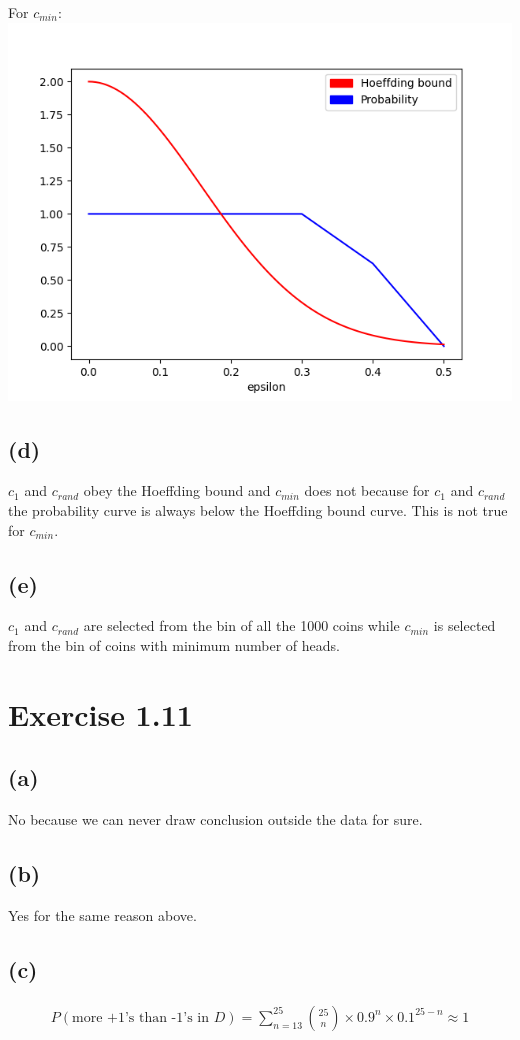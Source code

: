 \documentclass{article}
\begin{document}
		For $c_{min}$:\\
		\includegraphics[scale=0.8]{epsilon_min.png}
	\subsection*{(d)}
		$c_1$ and $c_{rand}$ obey the Hoeffding bound and $c_{min}$ does not because for $c_1$ and $c_{rand}$ the probability curve is always below the Hoeffding bound curve. This is not true for $c_{min}$.
	\subsection*{(e)}
		$c_1$ and $c_{rand}$ are selected from the bin of all the 1000 coins while $c_{min}$ is selected from the bin of coins with minimum number of heads.
		
	\section*{Exercise 1.11}
	\subsection*{(a)}
		No because we can never draw conclusion outside the data for sure.
		
	\subsection*{(b)}
		Yes for the same reason above.
		
	\subsection*{(c)}
		\begin{align*}
			P(\text{more +1's than -1's in }D) = \sum\limits_{n = 13}^{25}{25 \choose n}\times 0.9^n \times 0.1^{25 - n} \approx \boxed{1}
		\end{align*}
		
\end{document}
